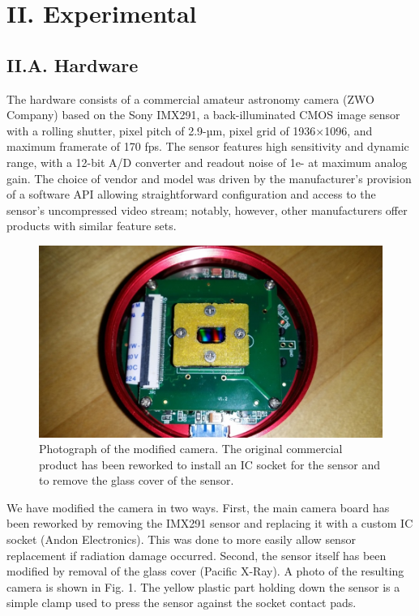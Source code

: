 \section{II. Experimental }

\subsection{II.A. Hardware}

The hardware consists of a commercial amateur astronomy camera (ZWO
Company) based on the Sony IMX291, a back-illuminated CMOS image sensor
with a rolling shutter, pixel pitch of 2.9-µm, pixel grid of 1936×1096,
and maximum framerate of 170 fps. The sensor features high sensitivity
and dynamic range, with a 12-bit A/D converter and readout noise of 1e-
at maximum analog gain. The choice of vendor and model was driven by the
manufacturer's provision of a software API allowing straightforward
configuration and access to the sensor's uncompressed video stream;
notably, however, other manufacturers offer products with similar
feature sets.

\begin{figure}[h] \label{cmos21}
\caption{
Photograph of the modified camera. The original
commercial product has been reworked to install an IC socket for the
sensor and to remove the glass cover of the sensor.
}
\centering
\includegraphics{NewCameraPaper_1.10.docx1502867018/media/image1.jpeg}
\end{figure}


We have modified the camera in two ways. First, the main camera board
has been reworked by removing the IMX291 sensor and replacing it with a
custom IC socket (Andon Electronics). This was done to more easily allow
sensor replacement if radiation damage occurred. Second, the sensor
itself has been modified by removal of the glass cover (Pacific X-Ray).
A photo of the resulting camera is shown in Fig. 1. The yellow plastic
part holding down the sensor is a simple clamp used to press the sensor
against the socket contact pads.

